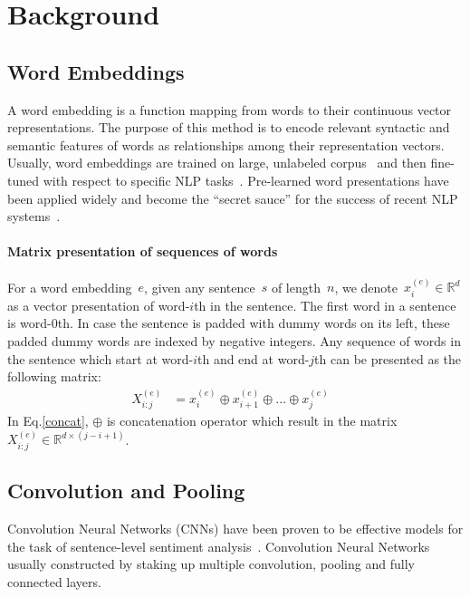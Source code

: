 \section{Background}
\subsection{Word Embeddings}
A word embedding is a function mapping from words to their continuous vector representations.
The purpose of this method is to encode relevant syntactic and semantic features of words as relationships among their representation vectors.
Usually, word embeddings are trained on large, unlabeled corpus~\cite{glove,word2vec} and then fine-tuned with respect to specific NLP tasks~\cite{treeLSTM,KimCNN}.   
Pre-learned word presentations have been applied widely and become the ``secret sauce'' for the success of recent NLP systems~\cite{Luong_betterword}.
\paragraph{Matrix presentation of sequences of words}
For a word embedding~\(e\), given any sentence~\(s\) of length~\(n\), we denote~\(x^{(e)}_i \in \mathbb{R}^d\) as a vector presentation of word-\(i\)th in the sentence.
The first word in a sentence is word-\(0\)th.
In case the sentence is padded with dummy words on its left, these padded dummy words are indexed by negative integers.
Any sequence of words in the sentence which start at word-\(i\)th and end at word-\(j\)th can be presented as the following matrix:
\begin{align}
X^{(e)}_{i:j} &= x^{(e)}_i \oplus x^{(e)}_{i+1} \oplus ... \oplus x^{(e)}_{j} &\label{concat}
\end{align}
In Eq.\eqref{concat}, \(\oplus\) is concatenation operator which result in the matrix \(X^{(e)}_{i:j} \in \mathbb{R}^{d \times (j-i+1)}\).
\subsection{Convolution and Pooling}
Convolution Neural Networks (CNNs) have been proven to be effective models for the task of sentence-level sentiment analysis~\cite{KimCNN, DCNN,2-layer-cnn}.
Convolution Neural Networks usually constructed by staking up multiple convolution, pooling and fully connected layers.
